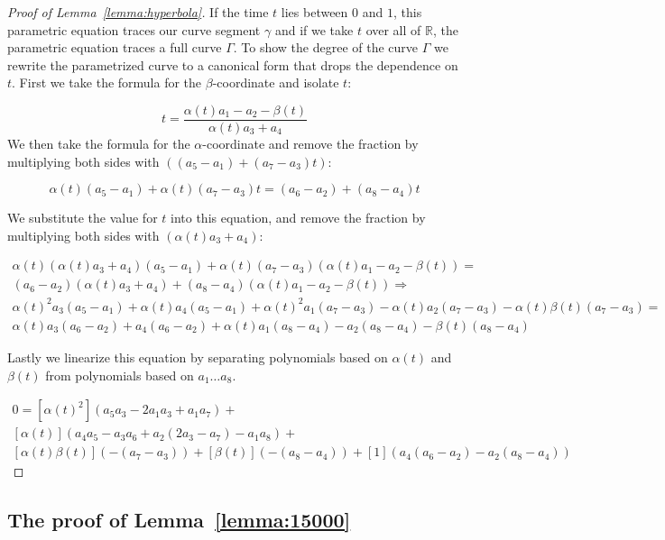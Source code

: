 \documentclass[UKenglish]{lipics-v2019}
\begin{document}
\begin{proof}[Proof of Lemma~\ref{lemma:hyperbola}]
  If the time $t$ lies between $0$ and $1$, this parametric equation traces our curve segment $\gamma$ and if we take $t$ over all of $\mathbb{R}$, the parametric equation traces a full curve $\Gamma$. To show the degree of the curve $\Gamma$ we rewrite the parametrized curve to a canonical form that drops the dependence on $t$. First we take the formula for the $\beta$-coordinate and isolate $t$:
  
  \[
     t = \frac{\alpha(t) a_1 - a_2  - \beta(t)}{\alpha(t) a_3 + a_4}
  \]
We then take the formula for the $\alpha$-coordinate and remove the fraction by multiplying both sides with $ ((a_5 - a_1)  + (a_7 - a_3) t)$:

\[ 
\alpha(t)(a_5 - a_1)  + \alpha(t)(a_7 - a_3) t = (a_6 - a_2) + (a_8 - a_4) t
\]

We substitute the value for $t$ into this equation, and remove the fraction by multiplying both sides with $(\alpha(t) a_3 + a_4)$:

\begin{align*}
\alpha(t)(\alpha(t) a_3 + a_4)(a_5 - a_1)  + \alpha(t)(a_7 - a_3) (\alpha(t) a_1 - a_2  - \beta(t)) = \\
(a_6 - a_2)(\alpha(t) a_3 + a_4) + (a_8 - a_4) (\alpha(t) a_1 - a_2  - \beta(t)) \Rightarrow \\
\alpha(t)^2a_3(a_5 - a_1) + \alpha(t)a_4(a_5 - a_1)  + \alpha(t)^2a_1(a_7 - a_3)
- \alpha(t)a_2(a_7 - a_3)  - \alpha(t)\beta(t)(a_7 - a_3) = \\
\alpha(t) a_3(a_6 - a_2) + a_4(a_6 - a_2) + \alpha(t)a_1(a_8 - a_4) - a_2 (a_8 - a_4) - \beta(t)(a_8 - a_4) 
\end{align*}

Lastly we linearize this equation by separating polynomials based on $\alpha(t)$ and $\beta(t)$ from polynomials based on $a_1 \ldots a_8$.

\begin{align}
\label{eq:hyperbola}
    0= [\alpha(t)^2](a_5 a_3 -2 a_1 a_3 + a_1 a_7)+ \\
    [\alpha(t)](a_4 a_5 - a_3 a_6 + a_2 (2 a_3 - a_7) - a_1 a_8) + \\
    [\alpha(t)\beta(t)](-(a_7 - a_3)) + [\beta(t)](-(a_8 - a_4)) + [1](a_4(a_6 - a_2)- a_2 (a_8 - a_4))
\end{align}
\end{proof}

\subsection{The proof of Lemma~\ref{lemma:15000}}
\end{document}
